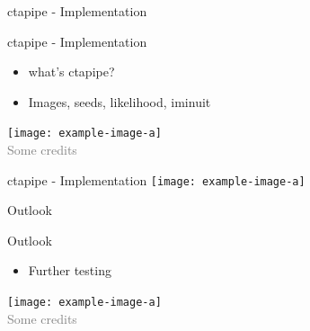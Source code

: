 \documentclass[aspectratio=1610, 9pt]{beamer}
\begin{document}
\begin{frame}
  \begin{center}
      \fontsize{40}{48} \selectfont\textcolor{tugreen}{ctapipe - Implementation}
  \end{center}
\end{frame}

\begin{frame}{ctapipe - Implementation}
    \begin{minipage}{0.49\textwidth}
        \begin{itemize}
            \item what's ctapipe?
            \item Images, seeds, likelihood, iminuit
        \end{itemize}
    \end{minipage}
    \hfill
    \begin{minipage}{0.5\textwidth}
        \centering
        \texttt{[image: example-image-a]}\\
        \tiny{{\textcolor{gray}{Some credits}}}
    \end{minipage}
\end{frame}

\begin{frame}{ctapipe - Implementation}
    \centering
    \texttt{[image: example-image-a]}\\
\end{frame}

\begin{frame}
  \begin{center}
    \fontsize{40}{48} \selectfont\textcolor{tugreen}{Outlook}
  \end{center}
\end{frame}

\begin{frame}{Outlook}
    \begin{minipage}{0.49\textwidth}
        \begin{itemize}
            \item Further testing
        \end{itemize}
    \end{minipage}
    \hfill
    \begin{minipage}{0.5\textwidth}
        \centering
        \texttt{[image: example-image-a]}\\
        \tiny{{\textcolor{gray}{Some credits}}}
    \end{minipage}
\end{frame}
\end{document}
